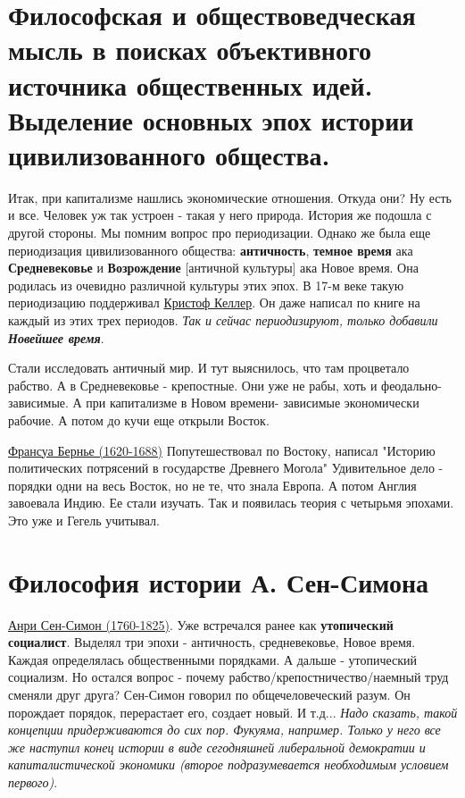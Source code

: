 \section{Философская и обществоведческая мысль в поисках объективного источника общественных идей. Выделение основных эпох истории цивилизованного общества.}
Итак, при капитализме нашлись экономические отношения. Откуда они? Ну есть и все. Человек уж так устроен - такая у него природа. История же подошла с другой стороны. Мы помним вопрос про периодизации. Однако же была еще периодизация цивилизованного общества: \textbf{античность}, \textbf{темное время} ака \textbf{Средневековье} и \textbf{Возрождение} [античной культуры] ака Новое время. Она родилась из очевидно различной культуры этих эпох. В 17-м веке такую периодизацию поддерживал \underline{Кристоф Келлер}. Он даже написал по книге на каждый из этих трех периодов. \textit{Так и сейчас периодизируют, только добавили \textbf{Новейшее время}}.

Стали исследовать античный мир. И тут выяснилось, что там процветало рабство. А в Средневековье - крепостные. Они уже не рабы, хоть и феодально-зависимые. А при капитализме в Новом времени- зависимые экономически рабочие. А потом до кучи еще открыли Восток. 

\underline{Франсуа Бернье (1620-1688)} Попутешествовал по Востоку, написал "Историю политических потрясений в государстве Древнего Могола" Удивительное дело - порядки одни на весь Восток, но не те, что знала Европа. А потом Англия завоевала Индию. Ее стали изучать. Так и появилась теория с четырьмя эпохами. Это уже и Гегель учитывал.

\section{Философия истории А. Сен-Симона}
\underline{Анри Сен-Симон (1760-1825)}. Уже встречался ранее как \textbf{утопический социалист}. Выделял три эпохи - античность, средневековье, Новое время. Каждая определялась общественными порядками. А дальше - утопический социализм. Но остался вопрос - почему рабство/крепостничество/наемный труд сменяли друг друга? Сен-Симон говорил по общечеловеческий разум. Он порождает порядок, перерастает его, создает новый. И т.д... \textit{Надо сказать, такой концепции придерживаются до сих пор. Фукуяма, например. Только у него все же наступил конец истории в виде сегодняшней либеральной демократии и капиталистической экономики (второе подразумевается необходимым условием первого)}.

